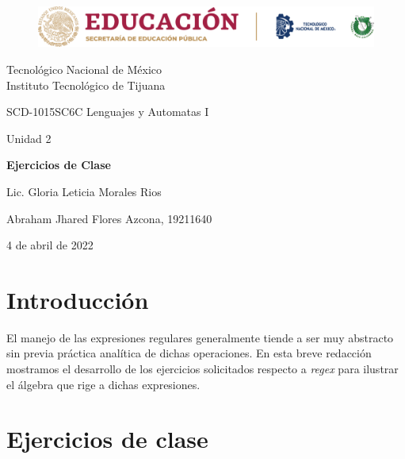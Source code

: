 \documentclass[stu, 12pt, letterpaper, donotrepeattitle, floatsintext, natbib]{apa7}
\begin{document}
    \begin{titlepage}
        \begin{figure}[ht]
            \centering
            \includegraphics[width=15cm]{logosITT.png}
        \end{figure}
        \centering
        {\Large Tecnológico Nacional de México\\Instituto Tecnológico de Tijuana\par}
        \vspace{1cm}
        {\Large SCD-1015SC6C Lenguajes y Automatas I\par}
        \vspace{1cm}
        {\Large Unidad 2\par}
        \vspace{1.5cm}
        {\Large\bfseries Ejercicios de Clase\par}
        \vspace{2cm}
        {\large Lic. Gloria Leticia Morales Rios\par}
        \vfill
            {\large Abraham Jhared Flores Azcona, 19211640\par}
        \vfill
        {\large 4 de abril de 2022}
    \end{titlepage}


\newpage
\section*{Introducción}
\begin{justifying}
El manejo de las expresiones regulares generalmente tiende a ser muy abstracto sin previa práctica analítica de dichas operaciones.
En esta breve redacción mostramos el desarrollo de los ejercicios solicitados respecto a \emph{regex} para ilustrar el álgebra
que rige a dichas expresiones.\par
\end{justifying}
\vspace{\baselineskip}
\section*{Ejercicios de clase}
\end{document}
